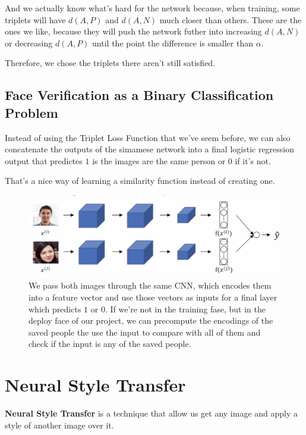 \documentclass[12pt, a4paper, oneside]{book}
\begin{document}
And we actually know what's hard for the network because, when training, some
triplets will have $d(A, P)$ and $d(A, N)$ much closer than others. These are
the ones we like, because they will push the network futher into increasing
$d(A, N)$ or decreasing $d(A, P)$ until the point the difference is smaller than
$\alpha$.

Therefore, we chose the triplets there aren't still satisfied.

\subsection{Face Verification as a Binary Classification Problem}%
\label{sub:face_verification_as_a_binary_classification_problem}

Instead of using the Triplet Loss Function that we've seem before, we can also
concatenate the outputs of the simamese network into a final logistic regression
output that predictes $1$ is the images are the same person or $0$ if it's not.

That's a nice way of learning a similarity function instead of creating one.

\begin{figure}[h]
\centering
\includegraphics[scale=0.5]{Res/simamese_binary_class.png}
\caption{We pass both images through the same CNN, which encodes them into a
feature vector and use those vectors as inputs for a final layer which predicts
$1$ or $0$. If we're not in the training fase, but in the deploy face of our
project, we can precompute the encodings of the saved people the use the input
to compare with all of them and check if the input is any of the saved people.}
\label{simamese_binary_class.png}
\end{figure}

\section{Neural Style Transfer}

\textbf{Neural Style Transfer} is a technique that allow us get any image and
apply a style of another image over it.
\end{document}
